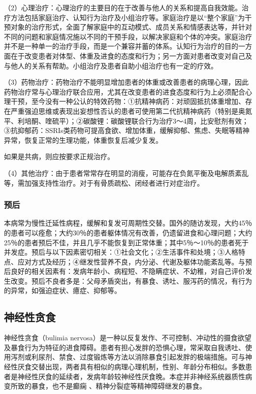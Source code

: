 （2）心理治疗：心理治疗的主要目的在于改善与他人的关系和提高自我效能。治疗方法包括家庭治疗、认知行为治疗及小组治疗等。家庭治疗是以“整个家庭”为干预对象的治疗形式，全面了解家庭中的互动模式、成员关系和情感表达等，并针对不同的问题和家庭情况施以不同的干预手段，以解决家庭和个体的冲突。家庭治疗并不是一种单一的治疗手段，而是一个兼容并蓄的体系。认知行为治疗的目的一方面在于改变患者对体型、体重及进食的态度和行为；另一方面对患者改变对自己及与他人的关系有帮助。小组治疗及患者自助小组治疗也有一定的疗效。

（3）药物治疗：药物治疗不能明显增加患者的体重或改善患者的病理心理，因此药物治疗常与心理治疗联合应用，尤其在改变患者的进食态度和行为上必须配合心理干预，至今没有一种公认的特效药物：①抗精神病药：对顽固抵抗体重增加、存在严重强迫思维或表现出妄想性否认的患者可使用第二代抗精神病药（特别是奥氮平、利培酮、喹硫平）；②碳酸锂：碳酸锂联合行为治疗3～4周，比安慰剂有效；③抗抑郁药：SSRIs类药物可提高食欲、增加体重，缓解抑郁、焦虑、失眠等精神异常，恢复正常的生理功能，体重恢复后减少复发。

如果是共病，则应按要求正规治疗。

（4）其他治疗：由于患者常常存在明显的消瘦，可能存在负氮平衡及电解质紊乱等，需加强支持性治疗。对于有骨质疏松、闭经者进行对症治疗。

\subsubsection{预后}

本病常为慢性迁延性病程，缓解和复发可周期性交替。国外的随访发现，大约45％的患者可以痊愈；大约30％的患者躯体情况有改善，仍遗留进食和心理问题；大约25％的患者预后不佳，并且几乎不能恢复到正常体重；其中5％～10％的患者死于并发症。预后与以下因素密切相关：①社会文化；②生活事件和处境；③人格特点、应对方式及经历；④继发性营养不良，内分泌、代谢及躯体功能紊乱等。与预后良好的相关因素有：发病年龄小、病程短、不隐瞒症状、不幼稚，对自己评价发生改变。预后不良者多是：父母矛盾突出，有暴食、诱吐、服泻药的情况，有行为的异常，如强迫症状、癔症、抑郁等。

\subsection{神经性贪食}

神经性贪食（bulimia
nervosa）是一种以反复发作、不可控制、冲动性的摄食欲望及暴食行为为特征的进食障碍。患者有担心发胖的恐惧心理，常采取自我诱吐、使用泻剂或利尿剂、禁食、过度锻炼等方法以消除暴食引起发胖的极端措施。可与神经性厌食交替出现，两者具有相似的病理心理机制，性别、年龄分布相似。多数患者是神经性厌食的延续者，发病年龄较神经性厌食晚。本症并非神经系统器质性病变所致的暴食，也不是癫痫
、精神分裂症等精神障碍继发的暴食。

